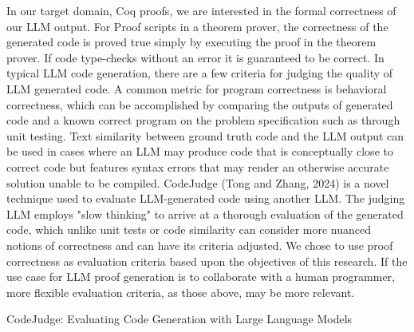 In our target domain, Coq proofs, 
we are interested in the formal correctness of our LLM output.
For Proof scripts in a theorem prover,
the correctness of the generated code is proved true
simply by executing the proof in the theorem prover.
If code type-checks without an error it is guaranteed to be correct.
In typical LLM code generation,
there are a few criteria for judging the quality of LLM generated code.  
A common metric for program correctness is behavioral correctness,
which can be accomplished by comparing the outputs of generated code
and a known correct program on the problem specification such as through unit testing.
Text similarity between ground truth code and the LLM output can be used
in cases where an LLM may produce code that is conceptually close
to correct code but features syntax errors that may render an
otherwise accurate solution unable to be compiled.
CodeJudge (Tong and Zhang, 2024) is a novel technique
used to evaluate LLM-generated code using another LLM.
The judging LLM employs "slow thinking" to arrive at a
thorough evaluation of the generated code,
which unlike unit tests or code similarity can consider
more nuanced notions of correctness and can have its
criteria adjusted.
We chose to use proof correctness as evaluation criteria
based upon the objectives of this research.
If the use case for LLM proof generation is to
collaborate with a human programmer,
more flexible evaluation criteria, as those above, may be more relevant. 

CodeJudge: Evaluating Code Generation 
with Large Language Models